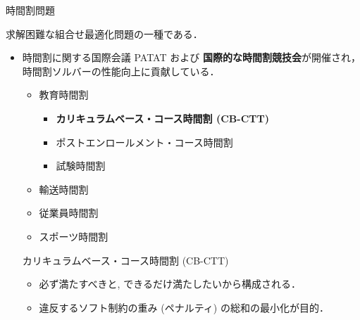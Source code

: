 \documentclass[11pt,dvipdfmx,handout]{beamer}
\begin{document}
\begin{frame}{時間割問題}
  \begin{block}{}\centering
    求解困難な組合せ最適化問題の一種である．
  \end{block}
  \begin{itemize}
  \item 時間割に関する国際会議 PATAT および
    \alert{\bf 国際的な時間割競技会}が開催され，
    時間割ソルバーの性能向上に貢献している．
    \begin{itemize}
    \item 教育時間割
      \begin{itemize}
      \item \alert{\bf カリキュラムベース・コース時間割 (CB-CTT)}
      \item ポストエンロールメント・コース時間割
      \item 試験時間割
      \end{itemize}
    \item 輸送時間割
    \item 従業員時間割
    \item スポーツ時間割
    \end{itemize}
  \begin{block}{カリキュラムベース・コース時間割 (CB-CTT)}
    \begin{itemize}
    \item 必ず満たすべきと, 
    できるだけ満たしたいから構成される．
    \item 違反するソフト制約の重み (ペナルティ) の総和の最小化が目的．
    \end{itemize}
   \end{block}
  \end{itemize}
\end{frame}
\end{document}
